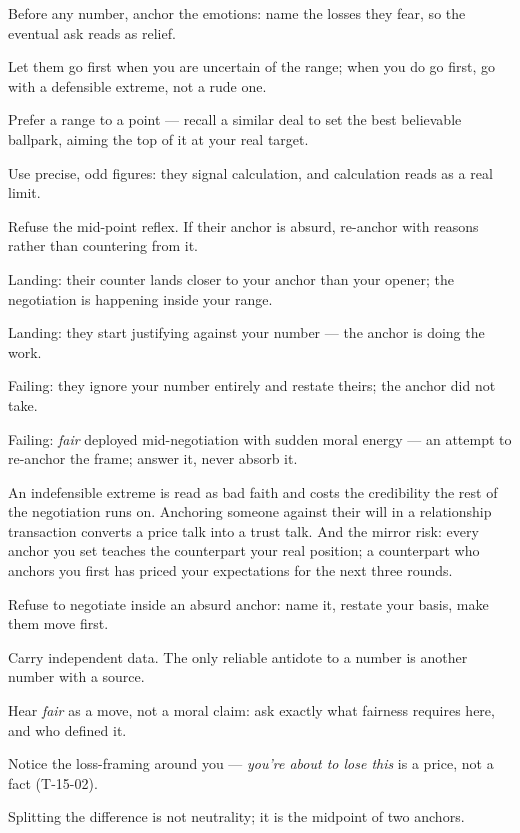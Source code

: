 \begin{application}
  \item Before any number, anchor the emotions: name the losses they fear, so the eventual ask reads as relief.
  \item Let them go first when you are uncertain of the range; when you do go first, go with a defensible extreme, not a rude one.
  \item Prefer a range to a point --- recall a similar deal to set the best believable ballpark, aiming the top of it at your real target.
  \item Use precise, odd figures: they signal calculation, and calculation reads as a real limit.
  \item Refuse the mid-point reflex. If their anchor is absurd, re-anchor with reasons rather than countering from it.
\end{application}
\begin{feedback}
  \item Landing: their counter lands closer to your anchor than your opener; the negotiation is happening inside your range.
  \item Landing: they start justifying against your number --- the anchor is doing the work.
  \item Failing: they ignore your number entirely and restate theirs; the anchor did not take.
  \item Failing: \emph{fair} deployed mid-negotiation with sudden moral energy --- an attempt to re-anchor the frame; answer it, never absorb it.
\end{feedback}
\begin{failure}
An indefensible extreme is read as bad faith and costs the credibility the rest of the negotiation runs on. Anchoring someone against their will in a relationship transaction converts a price talk into a trust talk. And the mirror risk: every anchor you set teaches the counterpart your real position; a counterpart who anchors you first has priced your expectations for the next three rounds.
\end{failure}
\begin{countermeasures}
  \item Refuse to negotiate inside an absurd anchor: name it, restate your basis, make them move first.
  \item Carry independent data. The only reliable antidote to a number is another number with a source.
  \item Hear \emph{fair} as a move, not a moral claim: ask exactly what fairness requires here, and who defined it.
  \item Notice the loss-framing around you --- \emph{you're about to lose this} is a price, not a fact (T-15-02).
  \item Splitting the difference is not neutrality; it is the midpoint of two anchors.
\end{countermeasures}

\seesources
{}
